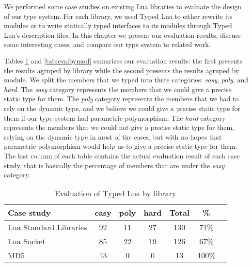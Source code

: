 
We performed some case studies on existing Lua libraries
to evaluate the design of our type system.
For each library, we used Typed Lua to either rewrite its modules
or to write statically typed interfaces to its modules through
Typed Lua's description files.
In this chapter we present our evaluation results, discuss
some interesting cases, and compare our type system to
related work.

Tables \ref{tab:evalbylib} and \ref{tab:evalbymod} sumarizes our
evaluation results:
the first presents the results agruped by library while
the second presents the results agruped by module.
We split the members that we typed into three categories:
\emph{easy}, \emph{poly}, and \emph{hard}.
The \emph{easy} category represents the members that we could give
a precise static type for them.
The \emph{poly} category represents the members that we had to
rely on the dynamic type, and we believe we could give a precise
static type for them if our type system had parametric polymorphism.
The \emph{hard} category represents the members that we could not
give a precise static type for them, relying on the dynamic type
in most of the cases, but with no hopes that parametric polymorphism
would help us to give a precise static type for them.
The last column of each table contains the actual evaluation result
of each case study, that is basically the percentage of members
that are under the \emph{easy} category.

\begin{table}[!ht]
\begin{center}
\begin{tabular}{|l|c|c|c|c|c|c|}
\hline
\textbf{Case study} & \textbf{easy} & \textbf{poly} & \textbf{hard} & \textbf{Total} & \textbf{\%} \\
\hline
Lua Standard Libraries & 92 & 11 & 27 & 130 & 71\% \\
\hline
Lua Socket & 85 & 22 & 19 & 126 & 67\% \\
\hline
MD5 & 13 & 0 & 0 & 13 & 100\% \\
\hline
\end{tabular}
\end{center}
\caption{Evaluation of Typed Lua by library}
\label{tab:evalbylib}
\end{table}


